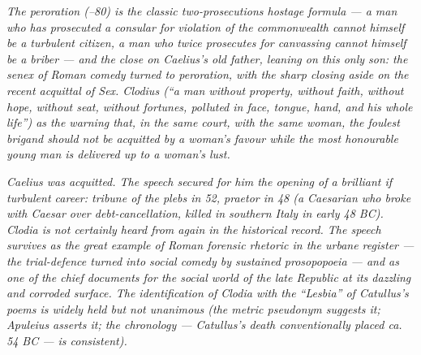 \textit{The peroration (\textsection{}--80) is the
classic two-prosecutions hostage formula --- a man who has
prosecuted a consular for violation of the commonwealth cannot
himself be a turbulent citizen, a man who twice prosecutes for
canvassing cannot himself be a briber --- and the close on
Caelius's old father, leaning on this only son: the
\textit{senex} of Roman comedy turned to peroration, with the
sharp closing aside on the recent acquittal of Sex. Clodius
(``a man without property, without faith, without hope, without
seat, without fortunes, polluted in face, tongue, hand, and his
whole life'') as the warning that, in the same court, with the
same woman, the foulest brigand should not be acquitted by a
woman's favour while the most honourable young man is delivered
up to a woman's lust.}

\textit{Caelius was acquitted. The speech secured for him the
opening of a brilliant if turbulent career: tribune of the plebs
in 52, praetor in 48 (a Caesarian who broke with Caesar over
debt-cancellation, killed in southern Italy in early 48 BC).
Clodia is not certainly heard from again in the historical
record. The speech survives as the great example of Roman
forensic rhetoric in the urbane register --- the trial-defence
turned into social comedy by sustained \textit{prosopopoeia} ---
and as one of the chief documents for the social world of the
late Republic at its dazzling and corroded surface. The
identification of Clodia with the ``Lesbia'' of Catullus's
poems is widely held but not unanimous (the metric pseudonym
suggests it; Apuleius asserts it; the chronology --- Catullus's
death conventionally placed ca. 54 BC --- is consistent).}
